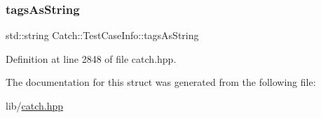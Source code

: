 \subsubsection{\texorpdfstring{tags\+As\+String}{tagsAsString}}
{\footnotesize\ttfamily std\+::string Catch\+::\+Test\+Case\+Info\+::tags\+As\+String}



Definition at line 2848 of file catch.\+hpp.



The documentation for this struct was generated from the following file\+:\begin{DoxyCompactItemize}
\item 
lib/\hyperlink{catch_8hpp}{catch.\+hpp}\end{DoxyCompactItemize}

